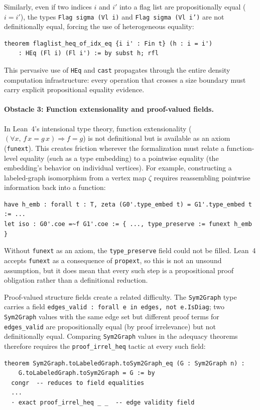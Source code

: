 \documentclass{article}
\newcommand{\lean}[1]{\texttt{#1}}
\begin{document}
Similarly, even if two indices $i$ and $i'$ into a flag list are propositionally
equal ($i = i'$), the types \lean{Flag sigma (Vl i)} and \lean{Flag sigma (Vl i')}
are not definitionally equal, forcing the use of heterogeneous equality:
\begin{lstlisting}
theorem flaglist_heq_of_idx_eq {i i' : Fin t} (h : i = i')
    : HEq (Fl i) (Fl i') := by subst h; rfl
\end{lstlisting}
This pervasive use of \lean{HEq} and \lean{cast} propagates through the entire
density computation infrastructure: every operation that crosses a size boundary
must carry explicit propositional equality evidence.

\paragraph{Obstacle 3: Function extensionality and proof-valued fields.}
In Lean~4's intensional type theory, function extensionality
($(\forall x,\, f\,x = g\,x) \Rightarrow f = g$) is not definitional but is
available as an axiom (\lean{funext}).  This creates friction wherever the
formalization must relate a function-level equality (such as a type embedding)
to a pointwise equality (the embedding's behavior on individual vertices).
For example, constructing a labeled-graph isomorphism from a vertex map $\zeta$
requires reassembling pointwise information back into a function:
\begin{lstlisting}
have h_emb : forall t : T, zeta (G0'.type_embed t) = G1'.type_embed t := ...
let iso : G0'.coe =~f G1'.coe := { ..., type_preserve := funext h_emb }
\end{lstlisting}
Without \lean{funext} as an axiom, the \lean{type\_preserve} field could not
be filled.  Lean~4 accepts \lean{funext} as a consequence of \lean{propext},
so this is not an unsound assumption, but it does mean that every such step is a
propositional proof obligation rather than a definitional reduction.

Proof-valued structure fields create a related difficulty.  The \lean{Sym2Graph}
type carries a field \lean{edges\_valid : forall e in edges, not e.IsDiag}; two
\lean{Sym2Graph} values with the same edge set but different proof terms for
\lean{edges\_valid} are propositionally equal (by proof irrelevance) but not
definitionally equal.  Comparing \lean{Sym2Graph} values in the adequacy
theorems therefore requires the \lean{proof\_irrel\_heq} tactic at every
such field:
\begin{lstlisting}
theorem Sym2Graph.toLabeledGraph.toSym2Graph_eq (G : Sym2Graph n) :
    G.toLabeledGraph.toSym2Graph = G := by
  congr  -- reduces to field equalities
  ...
  · exact proof_irrel_heq _ _  -- edge validity field
\end{lstlisting}
\end{document}
